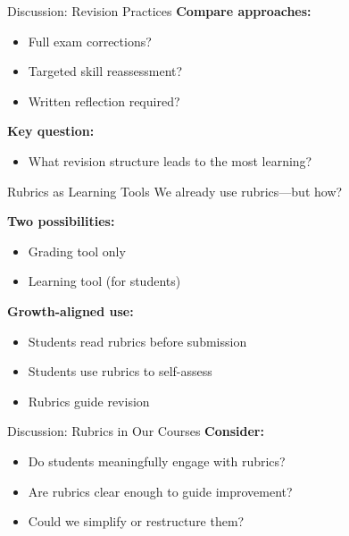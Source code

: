 \documentclass[dvipsnames]{beamer}
\begin{document}

\begin{frame}{Discussion: Revision Practices}
\textbf{Compare approaches:}
\begin{itemize}
\item Full exam corrections?
\item Targeted skill reassessment?
\item Written reflection required?
\end{itemize}

\vspace{1em}

\textbf{Key question:}
\begin{itemize}
\item What revision structure leads to the most learning?
\end{itemize}
\end{frame}


\begin{frame}{Rubrics as Learning Tools}
We already use rubrics—but how?

\vspace{1em}

\textbf{Two possibilities:}
\begin{itemize}
\item Grading tool only
\item Learning tool (for students)
\end{itemize}

\vspace{1em}

\textbf{Growth-aligned use:}
\begin{itemize}
\item Students read rubrics before submission
\item Students use rubrics to self-assess
\item Rubrics guide revision
\end{itemize}
\end{frame}


\begin{frame}{Discussion: Rubrics in Our Courses}
\textbf{Consider:}
\begin{itemize}
\item Do students meaningfully engage with rubrics?
\item Are rubrics clear enough to guide improvement?
\item Could we simplify or restructure them?
\end{itemize}
\end{frame}
\end{document}
